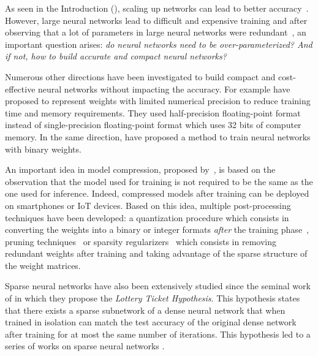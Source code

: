 As seen in the Introduction (), scaling up networks can lead to better accuracy~\cite{krizhevsky2012imagenet,he2016deep,vaswani2017attention}.
However, large neural networks lead to difficult and expensive training and after observing that a lot of parameters in large neural networks were redundant~\cite{dai2018compressing,frankle2018lottery}, an important question arises: \emph{do neural networks need to be over-parameterized? And if not, how to build accurate and compact neural networks?} 

Numerous other directions have been investigated to build compact and cost-effective neural networks without impacting the accuracy.
For example \citet{gupta2015deep,micikevicius2018mixed} have proposed to represent weights with limited numerical precision to reduce training time and memory requirements.
They used half-precision floating-point format instead of single-precision floating-point format which uses 32 bits of computer memory.
In the same direction, \citet{courbariaux2015binaryconnect} have proposed a method to train neural networks with binary weights.

An important idea in model compression, proposed by~\citet{bucilua2006model}, is based on the observation that the model used for training is not required to be the same as the one used for inference.
Indeed, compressed models after training can be deployed on smartphones or IoT devices.
Based on this idea, multiple post-processing techniques have been developed: a quantization procedure which consists in converting the weights into a binary or integer formats \emph{after} the training phase~\cite{mellempudi2017ternary,rastegariECCV16}, pruning techniques~\cite{dai2018compressing,han2015deep,lin2017runtime} or sparsity regularizers~\cite{collins2014memory,dai2018compressing,liu2015sparse} which consists in removing redundant weights after training and taking advantage of the sparse structure of the weight matrices.

Sparse neural networks have also been extensively studied since the seminal work of \citet{frankle2018lottery} in which they propose the \emph{Lottery Ticket Hypothesis}. 
This hypothesis states that there exists a sparse subnetwork of a dense neural network that when trained in isolation can match the test accuracy of the original dense network after training for at most the same number of iterations. 
This hypothesis led to a series of works on sparse neural networks \cite{zhou2019deconstructing,malach2019proving,evci2020rigging}.

